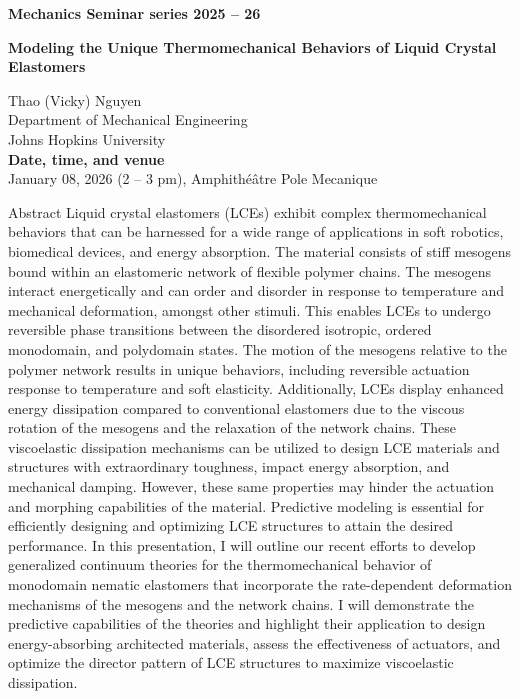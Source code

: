 \documentclass[a4paper,12pt,fleqn]{article}
\begin{document}
	\sffamily
\thispagestyle{titlepage}
\vspace*{-2em}
\begin{center}
	\huge \textbf{Mechanics Seminar series 2025 -- 26}
\end{center}

\begin{center}
	\Large 
	\textbf{Modeling the Unique Thermomechanical Behaviors of Liquid Crystal Elastomers} 
\end{center}
\begin{center}
	\large
	Thao (Vicky) Nguyen \\ 
	{\large Department of Mechanical Engineering \\
		Johns Hopkins University
	} \\
	\vspace*{1em}
	\textbf{Date, time, and venue }\\
	January 08, 2026 (2 -- 3 pm), Amphithéâtre Pole Mecanique
\end{center}

\begin{myhlbox}{{\large Abstract}}
	Liquid crystal elastomers (LCEs) exhibit complex thermomechanical behaviors that can be harnessed for a wide range of applications in soft robotics, biomedical devices, and energy absorption. The material consists of stiff mesogens bound within an elastomeric network of flexible polymer chains. The mesogens interact energetically and can order and disorder in response to temperature and mechanical deformation, amongst other stimuli. This enables LCEs to undergo reversible phase transitions between the disordered isotropic, ordered monodomain, and polydomain states. The motion of the mesogens relative to the polymer network results in unique behaviors, including reversible actuation response to temperature and soft elasticity. Additionally, LCEs display enhanced energy dissipation compared to conventional elastomers due to the viscous rotation of the mesogens and the relaxation of the network chains. These viscoelastic dissipation mechanisms can be utilized to design LCE materials and structures with extraordinary toughness, impact energy absorption, and mechanical damping. However, these same properties may hinder the actuation and morphing capabilities of the material.  Predictive modeling is essential for efficiently designing and optimizing LCE structures to attain the desired performance. In this presentation, I will outline our recent efforts to develop generalized continuum theories for the thermomechanical behavior of monodomain nematic elastomers that incorporate the rate-dependent deformation mechanisms of the mesogens and the network chains. I will demonstrate the predictive capabilities of the theories and highlight their application to design energy-absorbing architected materials, assess the effectiveness of actuators, and optimize the director pattern of LCE structures to maximize viscoelastic dissipation.   
\end{myhlbox}
\end{document}
